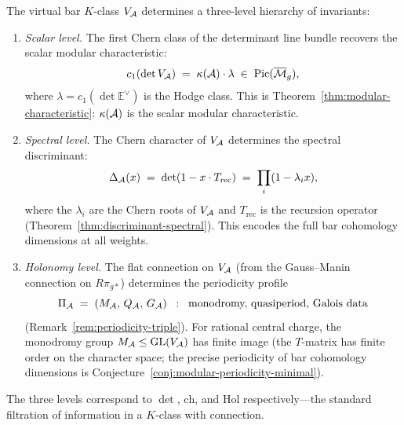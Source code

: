 \begin{proposition}\label{prop:characteristic-hierarchy}
The virtual bar $K$-class $V_{\mathcal{A}}$ determines a three-level
hierarchy of invariants:
\begin{enumerate}[label=\textup{(L\arabic*)}]
\item \emph{Scalar level.}
  The first Chern class of the determinant line bundle recovers the
  scalar modular characteristic:
  \[
  c_1(\det V_{\mathcal{A}})
  \;=\;
  \kappa(\mathcal{A}) \cdot \lambda
  \;\in\; \operatorname{Pic}(\overline{\mathcal{M}}_g),
  \]
  where $\lambda = c_1(\det \mathbb{E}^\vee)$ is the Hodge class.
  This is Theorem~\textup{\ref{thm:modular-characteristic}}:
  $\kappa(\mathcal{A})$ is the scalar modular characteristic.

\item \emph{Spectral level.}
  The Chern character of $V_{\mathcal{A}}$ determines the spectral
  discriminant:
  \[
  \Delta_{\mathcal{A}}(x)
  \;=\;
  \det(1 - x \cdot T_{\mathrm{rec}})
  \;=\;
  \prod_i (1 - \lambda_i x),
  \]
  where the $\lambda_i$ are the Chern roots of $V_{\mathcal{A}}$
  and $T_{\mathrm{rec}}$ is the recursion operator
  \textup{(}Theorem~\textup{\ref{thm:discriminant-spectral})}.
  This encodes the full bar cohomology dimensions at all weights.

\item \emph{Holonomy level.}
  The flat connection on $V_{\mathcal{A}}$ (from the Gauss--Manin connection
  on $R\pi_{g*}$) determines the periodicity profile
  \[
  \Pi_{\mathcal{A}} \;=\; (M_{\mathcal{A}},\, Q_{\mathcal{A}},\, G_{\mathcal{A}})
  \;\;:\;\;
  \text{monodromy, quasiperiod, Galois data}
  \]
  \textup{(}Remark~\textup{\ref{rem:periodicity-triple})}.
  For rational central charge, the monodromy group
  $M_{\mathcal{A}} \leq \mathrm{GL}(V_{\mathcal{A}})$ has finite image
  (the $T$-matrix has finite order on the character space;
  the precise periodicity of bar cohomology dimensions is
  Conjecture~\ref{conj:modular-periodicity-minimal}).
\end{enumerate}
The three levels correspond to $\det$, $\mathrm{ch}$, and
$\mathrm{Hol}$ respectively---the standard filtration of
information in a $K$-class with connection.
\end{proposition}

